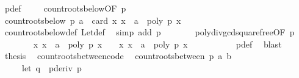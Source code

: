 \begin{isabellebody}
\ p{\isacharprime}{\isacharunderscore}def\ \isacommand{{\isachardot}}\isamarkupfalse%
\isanewline
\ \ \isamarkupfalse%
\ count{\isacharunderscore}roots{\isacharunderscore}below{\isacharbrackleft}OF\ {\isacharbackquoteopen}p{\isacharprime}\ {\isasymnoteq}\ {}{\isacharbackquoteclose}{\isacharbrackright}\isanewline
\ \ \ \ \ \ \isamarkupfalse%
\ {\isachardoublequoteopen}count{\isacharunderscore}roots{\isacharunderscore}below\ p\ a\ {\isacharequal}\ card\ {\isacharbraceleft}x{\isachardot}\ x\ {\isasymle}\ a\ {\isasymand}\ poly\ p{\isacharprime}\ x\ {\isacharequal}\ {}{\isacharbraceright}{\isachardoublequoteclose}\isanewline
\ \ \ \ \ \ \isamarkupfalse%
\ count{\isacharunderscore}roots{\isacharunderscore}below{\isacharunderscore}def\ Let{\isacharunderscore}def\ \isamarkupfalse%
\ {\isacharparenleft}simp\ add{\isacharcolon}\ {\isacharbackquoteopen}p\ {\isasymnoteq}\ {}{\isacharbackquoteclose}{\isacharparenright}\isanewline
\ \ \isamarkupfalse%
\ \isamarkupfalse%
\ poly{\isacharunderscore}div{\isacharunderscore}gcd{\isacharunderscore}squarefree{\isacharparenleft}{}{\isacharparenright}{\isacharbrackleft}OF\ {\isacharbackquoteopen}p\ {\isasymnoteq}\ {}{\isacharbackquoteclose}{\isacharbrackright}\isanewline
\ \ \ \ \ \ \isamarkupfalse%
\ {\isachardoublequoteopen}{\isacharbraceleft}x{\isachardot}\ x\ {\isasymle}\ a\ {\isasymand}\ poly\ p{\isacharprime}\ x\ {\isacharequal}\ {}{\isacharbraceright}\ {\isacharequal}\ {\isacharbraceleft}x{\isachardot}\ x\ {\isasymle}\ a\ {\isasymand}\ poly\ p\ x\ {\isacharequal}\ {}{\isacharbraceright}{\isachardoublequoteclose}\ \isanewline
\ \ \ \ \ \ \isamarkupfalse%
\ p{\isacharprime}{\isacharunderscore}def\ \isamarkupfalse%
\ blast\isanewline
\ \ \isamarkupfalse%
\ \isamarkupfalse%
\ {\isacharquery}thesis\ \isacommand{{\isachardot}}\isamarkupfalse%
\isanewline
{}\isamarkupfalse%
%
\endisatagproof
{\isafoldproof}%
%
\isadelimproof
\isanewline
%
\endisadelimproof
\isanewline
\isanewline
\isanewline
{}\isamarkupfalse%
\ count{\isacharunderscore}roots{\isacharunderscore}between{\isacharbrackleft}code{\isacharbrackright}{\isacharcolon}\isanewline
\ \ {\isachardoublequoteopen}count{\isacharunderscore}roots{\isacharunderscore}between\ p\ a\ b\ {\isacharequal}\isanewline
\ \ \ \ \ {\isacharparenleft}let\ q\ {\isacharequal}\ pderiv\ p\isanewline

\end{isabellebody}
